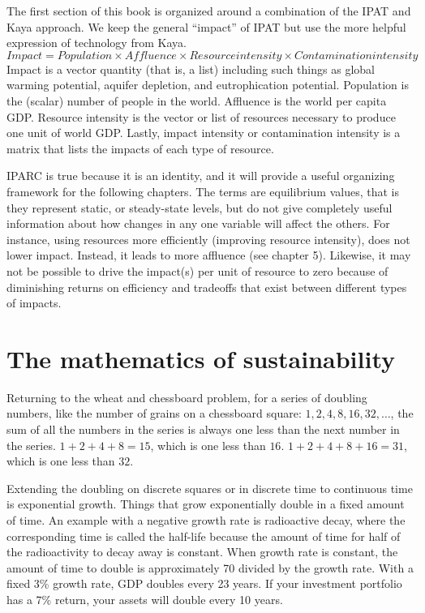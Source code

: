 \documentclass{book}\usepackage[]{graphicx}\usepackage[]{color}
\begin{document}
The first section of this book is organized around a combination of the IPAT and Kaya approach. We keep the general “impact” of IPAT but use the more helpful expression of technology from Kaya. 
\begin{equation}\label{eq:IPARC}
Impact = Population \times Affluence \times Resource intensity \times Contamination intensity
\end{equation}
Impact is a vector quantity (that is, a list) including such things as global warming potential, aquifer depletion, and eutrophication potential. Population is the (scalar) number of people in the world. Affluence is the world per capita GDP. Resource intensity is the vector or list of resources necessary to produce one unit of world GDP. Lastly, impact intensity or contamination intensity is a matrix that lists the impacts of each type of resource.

IPARC is true because it is an identity, and it will provide a useful organizing framework for the following chapters. The terms are equilibrium values, that is they represent static, or steady-state levels, but do not give completely useful information about how changes in any one variable will affect the others. For instance, using resources more efficiently (improving resource intensity), does not lower impact. Instead, it leads to more affluence (see chapter 5). Likewise, it may not be possible to drive the impact(s) per unit of resource to zero because of diminishing returns on efficiency and tradeoffs that exist between different types of impacts.

\section{The mathematics of sustainability}
Returning to the wheat and chessboard problem, for a series of doubling numbers, like the number of grains on a chessboard square: $1, 2, 4, 8, 16, 32, …$, the sum of all the numbers in the series is always one less than the next number in the series. $1+2+4+8 = 15$, which is one less than $16$. $1+2+4+8+16 = 31$, which is one less than $32$. 

Extending the doubling on discrete squares or in discrete time to continuous time is exponential growth. Things that grow exponentially double in a fixed amount of time. An example with a negative growth rate is radioactive decay, where the corresponding time is called the half-life because the amount of time for half of the radioactivity to decay away is constant. When growth rate is constant, the amount of time to double is approximately 70 divided by the growth rate. With a fixed 3\% growth rate, GDP doubles every 23 years. If your investment portfolio has a 7\% return, your assets will double every 10 years. 
\end{document}
